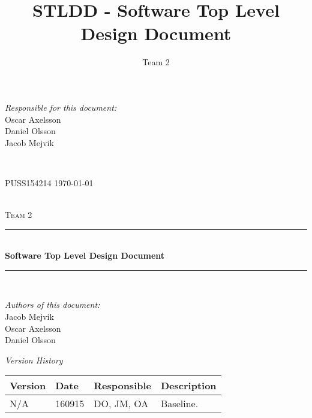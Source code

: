 \documentclass[a4paper]{article}
\title{STLDD - Software Top Level Design Document}
\author{Team 2}
\begin{document}
\begin{titlepage}
\newcommand{\HRule}{\rule{\linewidth}{0.5mm}}

\begin{minipage}{0.5\textwidth}
\begin{flushleft} %
\textit{Responsible for this document:}\\
Oscar Axelsson \\
Daniel Olsson \\
Jacob Mejvik
\end{flushleft}
\end{minipage}
~
\begin{minipage}{0.4\textwidth}
\begin{flushright}
PUSS154214
\today
\end{flushright}
\end{minipage}\\[3cm]

\centering
\textsc{\LARGE Team 2}\\[0.5cm]

\HRule \\[0.4cm]
{ \huge \bfseries Software Top Level Design Document}\\[0.4cm] %
\HRule \\[1.5cm]

\vfill
\begin{flushleft}
\textit{Authors of this document:}\\
Jacob Mejvik \\
Oscar Axelsson \\
Daniel Olsson
\end{flushleft}

\end{titlepage}
\setcounter{tocdepth}{2}

\begin{center}
\textit{\large Version History}

    \begin{tabular}{ | l | l | l | p{5cm} |}
    \hline
    \textbf{Version} 	& \textbf{Date} 	& \textbf{Responsible} 	& \textbf{Description} 		\\ \hline
    N/A				 	& 160915 			& DO, JM, OA			&  Baseline. 				\\ \hline
    \end{tabular}
\end{center}
\end{document}
